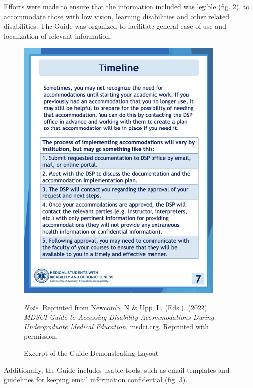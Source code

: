 \documentclass[11.5pt]{sig-alternate} %
\begin{document}
\begin{large}
Efforts were made to ensure that the information included was legible (fig. 2), to accommodate those with low vision, learning disabilities and other related disabilities. The Guide was organized to facilitate general ease of use and localization of relevant information.

\begin{figure}[htbp]
    \centering
    \includegraphics[width=0.9\textwidth]{images/fig2.png}
    \caption{Excerpt of the Guide Demonstrating Layout}
    \label{Figure 2}
    \justifying
    \textit{Note}. Reprinted from Newcomb, N  \&  Upp, L. (Eds.). (2022). \textit{MDSCI Guide to Accessing Disability Accommodations During Undergraduate Medical Education}. msdci.org. Reprinted with permission.
\end{figure}

Additionally, the Guide includes usable tools, such as email templates and guidelines for keeping email information confidential (fig. 3).


\end{large}
\end{document}
